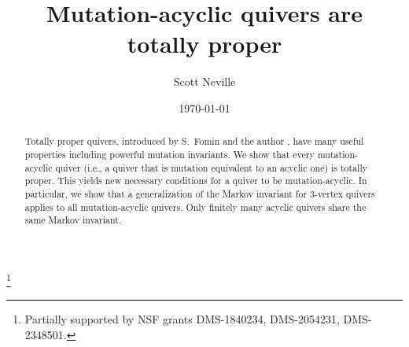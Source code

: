 \documentclass[11pt, letterpaper]{amsart}
\title{Mutation-acyclic quivers are totally proper}
\theoremstyle{definition}
\numberwithin{equation}{section}
\begin{document}
\author{Scott Neville}
\address{\hspace{-.3in} Department of Mathematics, University of Michigan,
Ann Arbor, MI 48109, USA}

\date{\today}

\thanks{Partially supported by NSF grants DMS-1840234, DMS-2054231, DMS-2348501.
}



\begin{abstract}
Totally proper quivers, introduced by S.~Fomin and the author \cite{COQ}, have many useful properties including powerful mutation invariants.
We show that every mutation-acyclic quiver (i.e., a quiver that is mutation equivalent to an acyclic one) is totally proper.
This yields new necessary conditions for a quiver to be mutation-acyclic.
In particular, we show that a generalization of the Markov invariant for $3$-vertex quivers applies to all mutation-acyclic quivers.
Only finitely many acyclic quivers share the same Markov invariant.
%
%
%
\end{abstract}

\maketitle

\end{document}
